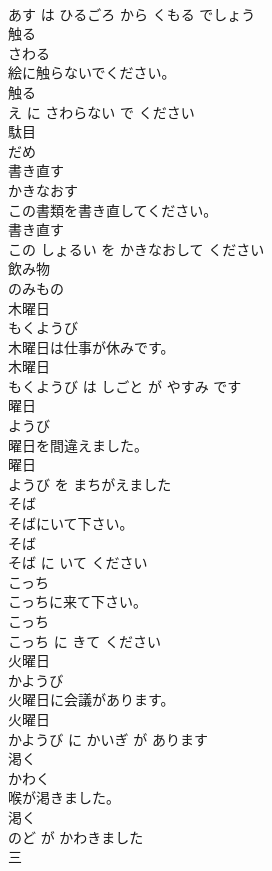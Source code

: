 \documentclass[8pt]{extreport}
\begin{document}
\begin{CJK}{UTF8}{min}
\\	あす は ひるごろ から くもる でしょう			
\\	触る	
\\	さわる			
\\	絵に触らないでください。	
\\	触る 
\\	え に さわらない で ください			
\\	駄目	
\\	だめ			
\\	書き直す	
\\	かきなおす			
\\	この書類を書き直してください。	
\\	書き直す 
\\	この しょるい を かきなおして ください			
\\	飲み物	
\\	のみもの			
\\	木曜日	
\\	もくようび			
\\	木曜日は仕事が休みです。	
\\	木曜日 
\\	もくようび は しごと が やすみ です			
\\	曜日	
\\	ようび			
\\	曜日を間違えました。	
\\	曜日 
\\	ようび を まちがえました			
\\	そば	
\\	そばにいて下さい。	
\\	そば 
\\	そば に いて ください			
\\	こっち	
\\	こっちに来て下さい。	
\\	こっち 
\\	こっち に きて ください			
\\	火曜日	
\\	かようび			
\\	火曜日に会議があります。	
\\	火曜日 
\\	かようび に かいぎ が あります			
\\	渇く	
\\	かわく			
\\	喉が渇きました。	
\\	渇く 
\\	のど が かわきました			
\\	三	

\end{CJK}
\end{document}
